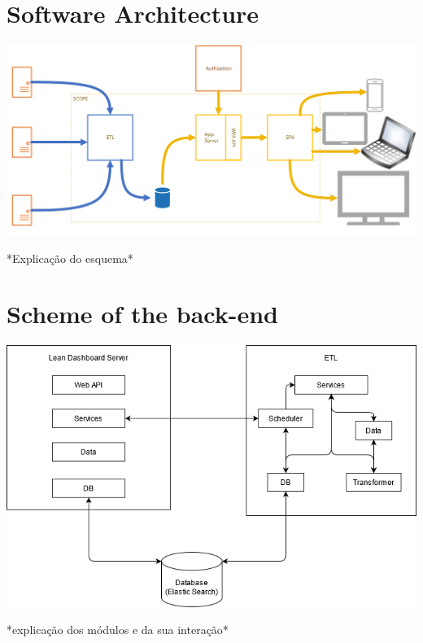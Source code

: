 \documentclass[a4paper,twoside,10pt]{report}
\begin{document}
\newpage
\section{Software Architecture}

\begin{center}
    \includegraphics[width=\textwidth]{lean-dashboard-software-architecture.png}
\end{center}

*Explicação do esquema*

\section{Scheme of the back-end}
\begin{center}
    \includegraphics[width=\textwidth]{arquitetura_software.png}
\end{center}
*explicação dos módulos e da sua interação*

\newpage
\end{document}
